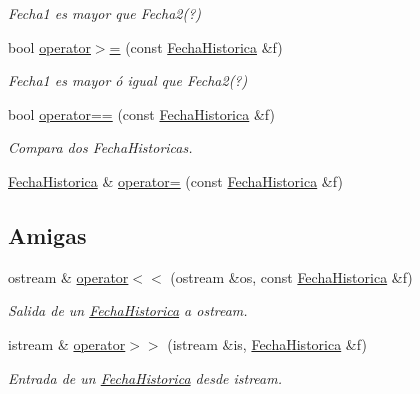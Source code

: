 \begin{DoxyCompactItemize}
\begin{DoxyCompactList}\small\item\em Fecha1 es mayor que Fecha2(?) \end{DoxyCompactList}\item 
bool \hyperlink{classFechaHistorica_a78073b10eb11db05032a309e4ec544cf}{operator$>$=} (const \hyperlink{classFechaHistorica}{Fecha\+Historica} \&f)
\begin{DoxyCompactList}\small\item\em Fecha1 es mayor ó igual que Fecha2(?) \end{DoxyCompactList}\item 
bool \hyperlink{classFechaHistorica_ab1c2bab13fc15d200860b37f61988504}{operator==} (const \hyperlink{classFechaHistorica}{Fecha\+Historica} \&f)
\begin{DoxyCompactList}\small\item\em Compara dos Fecha\+Historicas. \end{DoxyCompactList}\item 
\hyperlink{classFechaHistorica}{Fecha\+Historica} \& \hyperlink{classFechaHistorica_a712415b87f836c744f47b697ef0ff2aa}{operator=} (const \hyperlink{classFechaHistorica}{Fecha\+Historica} \&f)
\end{DoxyCompactItemize}
\subsection*{Amigas}
\begin{DoxyCompactItemize}
\item 
ostream \& \hyperlink{classFechaHistorica_ae7ffc75da1b9b42da839968d57c0dc9c}{operator$<$$<$} (ostream \&os, const \hyperlink{classFechaHistorica}{Fecha\+Historica} \&f)
\begin{DoxyCompactList}\small\item\em Salida de un \hyperlink{classFechaHistorica}{Fecha\+Historica} a ostream. \end{DoxyCompactList}\item 
istream \& \hyperlink{classFechaHistorica_a25a93d162aadd3c52aa1f3d1831e3d75}{operator$>$$>$} (istream \&is, \hyperlink{classFechaHistorica}{Fecha\+Historica} \&f)
\begin{DoxyCompactList}\small\item\em Entrada de un \hyperlink{classFechaHistorica}{Fecha\+Historica} desde istream. \end{DoxyCompactList}\end{DoxyCompactItemize}



